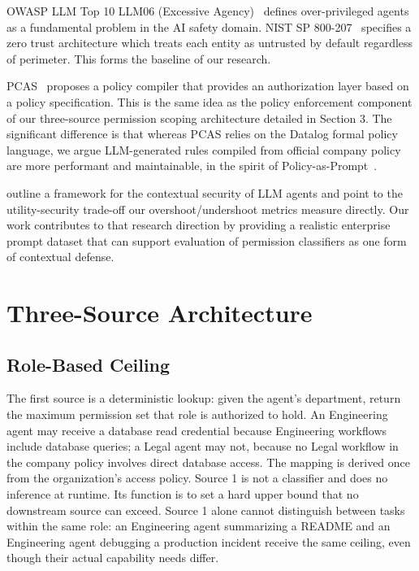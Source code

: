 \documentclass{article}
\theoremstyle{plain}
\theoremstyle{definition}
\theoremstyle{remark}
\begin{document}
OWASP LLM Top 10 LLM06 (Excessive Agency)~\citep{owasp2025llmtop10} 
defines over-privileged agents as a fundamental problem in the AI safety 
domain. NIST SP 800-207~\citep{nist800207} specifies a zero trust 
architecture which treats each entity as untrusted by default regardless 
of perimeter. This forms the baseline of our research.

PCAS~\citep{palumbo2026pcas} proposes a policy compiler that provides 
an authorization layer based on a policy specification. This is the 
same idea as the policy enforcement component of our three-source 
permission scoping architecture detailed in Section 3. The significant 
difference is that whereas PCAS relies on the Datalog formal policy 
language, we argue LLM-generated rules compiled from official company 
policy are more performant and maintainable, in the spirit of 
Policy-as-Prompt~\citep{kholkar2025policyasprompt}.

\citet{zhang2026formalizing} outline a framework for the contextual 
security of LLM agents and point to the utility-security trade-off our 
overshoot/undershoot metrics measure directly. Our work contributes to 
that research direction by providing a realistic enterprise prompt 
dataset that can support evaluation of permission classifiers as one 
form of contextual defense.

\section{Three-Source Architecture}
\subsection{Role-Based Ceiling}
The first source is a deterministic lookup: given the agent's department, 
return the maximum permission set that role is authorized to hold. An 
Engineering agent may receive a database read credential because Engineering 
workflows include database queries; a Legal agent may not, because no Legal 
workflow in the company policy involves direct database access. The mapping 
is derived once from the organization's access policy. Source 1 is not a 
classifier and does no inference at runtime. Its function is to set a hard 
upper bound that no downstream source can exceed. Source 1 alone cannot 
distinguish between tasks within the same role: an Engineering agent 
summarizing a README and an Engineering agent debugging a production 
incident receive the same ceiling, even though their actual capability 
needs differ.
\end{document}
